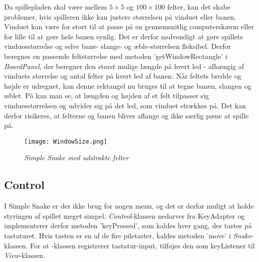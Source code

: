 Da spillepladen skal være mellem $5\times 5$ og $100\times 100$ felter, kan det skabe problemer, hvis spilleren ikke kan justere størrelsen på vinduet eller banen. Vinduet kan være for stort til at passe på en gennemsnitlig computerskærm eller for lille til at gøre hele banen synlig. Det er derfor nødvendigt at gøre spillets vinduesstørrelse og selve bane- slange- og æble-størrelsen fleksibel. Derfor beregnes en passende feltstørrelse med metoden 'getWindowRectangle' i \textit{BoardPanel}, der beregner den størst mulige længde på hvert led - afhængig af vinduets størrelse og antal felter på hvert led af banen. Når feltets bredde og højde er udregnet, kan denne rektangel nu bruges til at tegne banen, slangen og æblet.
På  kan man se, at længden og højden af et felt tilpasser sig vinduesstørrelsen og udvider sig på det led, som vinduet strækkes på. Det kan derfor risikeres, at felterne og banen bliver aflange og ikke særlig pæne at spille på.

\begin{figure}[h]
	\centering
	\texttt{[image: WindowSize.png]}
	\caption{\textit{Simple Snake med udstrakte felter}}
\end{figure}

\subsection{Control}
I Simple Snake er der ikke brug for nogen menu, og det er derfor muligt at holde styringen af spillet meget simpel. \textit{Control}-klassen nedarver fra KeyAdapter og implementerer derfor metoden 'keyPressed', som kaldes hver gang, der tastes på tastaturet. Hvis tasten er en af de fire piletaster, kaldes metoden 'move' i \textit{Snake}-klassen. For at -klassen registrerer tastatur-input, tilføjes den som keyListener til \textit{View}-klassen.
